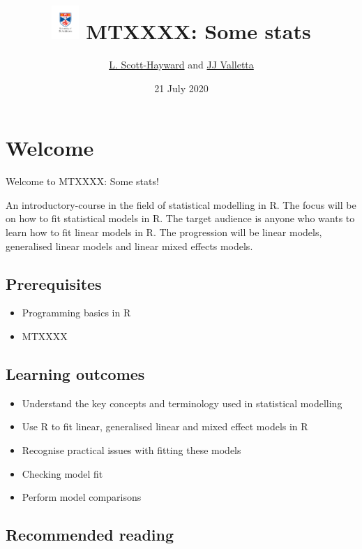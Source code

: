 \documentclass[
]{book}
\title{\includegraphics[width=0.4in,height=\textheight]{standard-vertical-black.png} MTXXXX: Some stats}
\author{\href{lass@st-andrews.ac.uk}{L. Scott-Hayward} and \href{jjv1@st-andrews.ac.uk}{JJ Valletta}}
\date{21 July 2020}
\providecommand{\tightlist}{%
  \setlength{\itemsep}{0pt}\setlength{\parskip}{0pt}}
\theoremstyle{definition}
\theoremstyle{definition}
\theoremstyle{definition}
\theoremstyle{remark}
\begin{document}
\maketitle

{
\hypersetup{linkcolor=}
\setcounter{tocdepth}{1}
\tableofcontents
}
\hypertarget{welcome}{%
\chapter*{Welcome}\label{welcome}}

Welcome to MTXXXX: Some stats!

An introductory-course in the field of statistical modelling in R. The focus will be on how to fit statistical models in R. The target audience is anyone who wants to learn how to fit linear models in R. The progression will be linear models, generalised linear models and linear mixed effects models.

\hypertarget{prerequisites}{%
\section*{Prerequisites}\label{prerequisites}}

\begin{itemize}
\tightlist
\item
  Programming basics in R
\item
  MTXXXX
\end{itemize}

\hypertarget{learning-outcomes}{%
\section*{Learning outcomes}\label{learning-outcomes}}

\begin{itemize}
\tightlist
\item
  Understand the key concepts and terminology used in statistical modelling
\item
  Use R to fit linear, generalised linear and mixed effect models in R
\item
  Recognise practical issues with fitting these models
\item
  Checking model fit
\item
  Perform model comparisons
\end{itemize}

\hypertarget{recommended-reading}{%
\section*{Recommended reading}\label{recommended-reading}}
\end{document}
